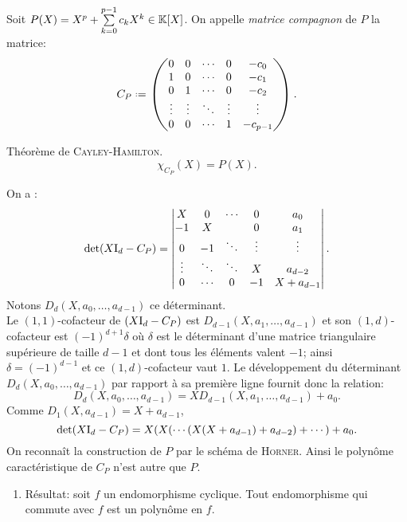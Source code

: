 \begin{defi}
    Soit $P(X) = X^p + \sum\limits_{k=0}^{p-1} c_kX^k \in \mathbb{K}[X]$. On appelle \emph{matrice compagnon} de $P$ la matrice:
    $$ C_P \defeq
    \begin{pmatrix}
    0 & 0 & \cdots & 0 & -c_0 \\
    1 & 0 & \cdots & 0 & -c_1 \\
    0 & 1 & \cdots & 0 & -c_2 \\
    \vdots & \vdots & \ddots & \vdots & \vdots \\
    0 & 0 & \cdots & 1 & -c_{p-1}
    \end{pmatrix}.
    $$
\end{defi}

\begin{theo}
    Théorème de \textsc{Cayley}-\textsc{Hamilton}.
    $$\chi_{C_P}(X) = P(X).$$
\end{theo}    

\begin{preuve}
    On a :
    $$
    \det(X \mathrm{I}_d - C_P) = 
    \begin{vmatrix}
        X & 0 & \cdots & 0 & a_0 \\
        -1 & X & & 0 & a_1 \\
        0 & -1 & \ddots & \vdots & \vdots \\
        \vdots & \ddots & \ddots & X & a_{d-2} \\
        0 & \cdots & 0 & -1 & X + a_{d-1}
    \end{vmatrix}.
    $$
    Notons $D_d(X, a_0, \dots, a_{d-1})$ ce déterminant. \\
    Le $(1,1)$-cofacteur de $(X \mathrm{I}_d - C_P)$ est $D_{d-1}(X, a_1, \dots, a_{d-1})$ et son $(1,d)$-cofacteur est $(-1)^{d+1} \delta$ où $\delta$ est le déterminant d'une matrice triangulaire supérieure de taille $d-1$ et dont tous les éléments valent $-1$; ainsi $\delta = (-1)^{d-1}$ et ce $(1,d)$-cofacteur vaut $1$. Le développement du déterminant $D_d(X, a_0, \dots, a_{d-1})$ par rapport à sa première ligne fournit donc la relation:
    $$D_d(X, a_0, \dots, a_{d-1}) = X D_{d-1}(X, a_1, \dots, a_{d-1}) + a_0.$$
    Comme $D_1(X, a_{d-1}) = X + a_{d-1}$,
    $$\det(X \mathrm{I}_d - C_P) = X(X(\cdots(X(X+a_{d-1}) + a_{d-2}) + \cdots) + a_0.$$
    On reconnaît la construction de $P$ par le schéma de \textsc{Horner}. Ainsi le polynôme caractéristique de $C_P$ n'est autre que $P$. 
\end{preuve} 

\begin{enumerate}
    \item Résultat: soit $f$ un endomorphisme cyclique. Tout endomorphisme qui commute avec $f$ est un polynôme en $f$.
\end{enumerate}

